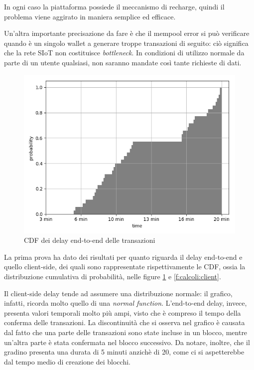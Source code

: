 In ogni caso la piattaforma possiede il meccanismo di recharge, quindi il problema viene aggirato in maniera semplice ed efficace.

Un'altra importante precisazione da fare è che il mempool error si può verificare quando è un singolo wallet a generare troppe transazioni di seguito: ciò significa che la rete SIoT non costituisce \textit{bottleneck}. In condizioni di utilizzo normale da parte di un utente qualsiasi, non saranno mandate così tante richieste di dati.

\begin{figure}[h!t]
\centerline{\includegraphics[width=\textwidth]{img/end-to-endGIUSTO}}
\caption{CDF dei delay end-to-end delle transazioni}
\label{f:calcoli:end2end}
\end{figure}

La prima prova ha dato dei risultati per quanto riguarda il delay end-to-end e quello client-side, dei quali sono rappresentate rispettivamente le CDF, ossia la distribuzione cumulativa di probabilità, nelle figure \ref{f:calcoli:end2end} e \ref{f:calcoli:client}. 



Il client-side delay tende ad assumere una distribuzione normale: il grafico, infatti, ricorda molto quello di una \textit{normal function}. 
L'end-to-end delay, invece, presenta valori temporali molto più ampi, visto che è compreso il tempo della conferma delle transazioni. La discontinuità che si osserva nel grafico è causata dal fatto che una parte delle transazioni sono state incluse in un blocco, mentre un'altra parte è stata confermata nel blocco successivo. Da notare, inoltre, che il gradino presenta una durata di 5 minuti anzichè di 20, come ci si aspetterebbe dal tempo medio di creazione dei blocchi.

